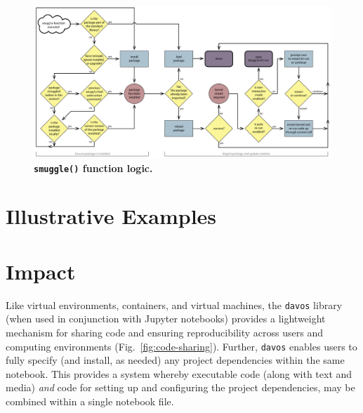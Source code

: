 \documentclass[preprint,12pt,a4paper]{elsarticle}
\begin{document}
\begin{figure}[tp]
\centering
\includegraphics[width=\textwidth]{figs/flow_chart}
\caption{\small \textbf{\texttt{smuggle()} function logic.} }
\label{fig:flow-chart}
\end{figure}



\section{Illustrative Examples}



\section{Impact}

Like virtual environments, containers, and virtual machines, the
\texttt{davos} library (when used in conjunction with Jupyter
notebooks) provides a lightweight mechanism for sharing code and
ensuring reproducibility across users and computing environments
(Fig.~\ref{fig:code-sharing}). Further, \texttt{davos} enables users
to fully specify (and install, as needed) any project dependencies
within the same notebook. This provides a system whereby executable
code (along with text and media) \textit{and} code for setting up and
configuring the project dependencies, may be combined within a single
notebook file.
\end{document}
